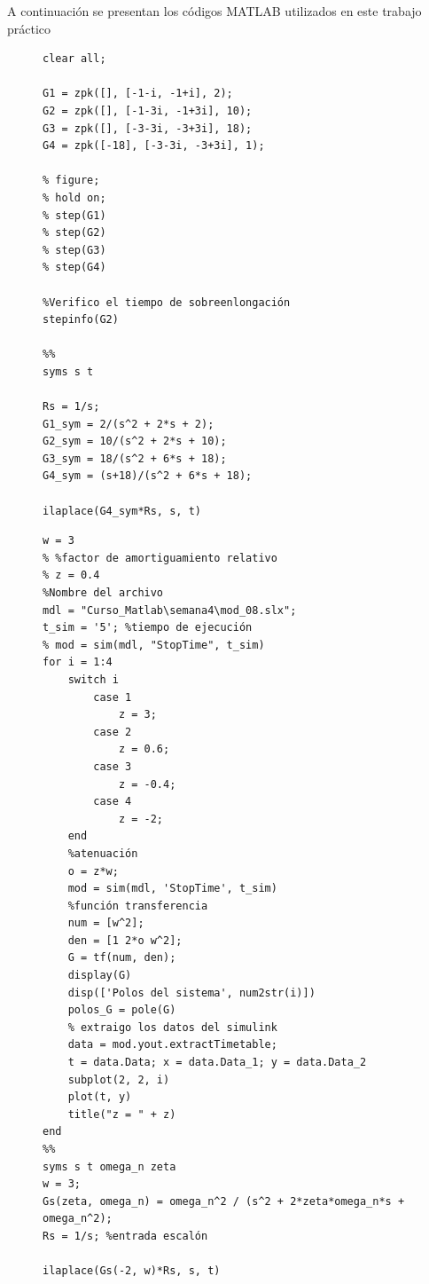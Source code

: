 A continuación se presentan los códigos MATLAB utilizados en este trabajo práctico


\begin{figure}[ht!]
    \begin{lstlisting}[caption = {Entrada escalón a distintos sistemas de segundo orden con variación en sus polos, ceros y ganancias.}, label = {cod:2}]
clear all;

G1 = zpk([], [-1-i, -1+i], 2);
G2 = zpk([], [-1-3i, -1+3i], 10);
G3 = zpk([], [-3-3i, -3+3i], 18);
G4 = zpk([-18], [-3-3i, -3+3i], 1);

% figure;
% hold on;
% step(G1)
% step(G2)
% step(G3)
% step(G4)

%Verifico el tiempo de sobreenlongación
stepinfo(G2)

%%
syms s t 

Rs = 1/s;
G1_sym = 2/(s^2 + 2*s + 2);
G2_sym = 10/(s^2 + 2*s + 10);
G3_sym = 18/(s^2 + 6*s + 18);
G4_sym = (s+18)/(s^2 + 6*s + 18);

ilaplace(G4_sym*Rs, s, t)
    \end{lstlisting}
\end{figure}

\begin{figure}[ht!]
    \begin{lstlisting}[caption = {Ciclo \texttt{for} utilizado para generar los subplots y verificación de la respuesta en el dominio del tiempo usando cálculo simbólico}, label = {cod:1}]
% frecuencia natural no amortiguada
w = 3
% %factor de amortiguamiento relativo
% z = 0.4
%Nombre del archivo
mdl = "Curso_Matlab\semana4\mod_08.slx";
t_sim = '5'; %tiempo de ejecución
% mod = sim(mdl, "StopTime", t_sim)
for i = 1:4
    switch i
        case 1
            z = 3;
        case 2 
            z = 0.6;
        case 3
            z = -0.4;
        case 4 
            z = -2;
    end
    %atenuación
    o = z*w;
    mod = sim(mdl, 'StopTime', t_sim)
    %función transferencia
    num = [w^2];
    den = [1 2*o w^2];
    G = tf(num, den);
    display(G)
    disp(['Polos del sistema', num2str(i)])
    polos_G = pole(G)
    % extraigo los datos del simulink
    data = mod.yout.extractTimetable;
    t = data.Data; x = data.Data_1; y = data.Data_2
    subplot(2, 2, i)
    plot(t, y)
    title("z = " + z)
end
%%
syms s t omega_n zeta
w = 3;
Gs(zeta, omega_n) = omega_n^2 / (s^2 + 2*zeta*omega_n*s + omega_n^2);
Rs = 1/s; %entrada escalón

ilaplace(Gs(-2, w)*Rs, s, t)
    \end{lstlisting}
\end{figure}



